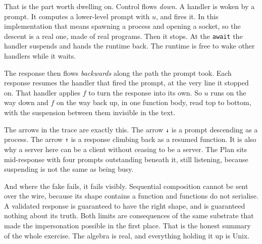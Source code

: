 \documentclass[11pt,a4paper]{article}
\begin{document}
That is the part worth dwelling on. Control flows \emph{down}. A handler is woken by a prompt. It
computes a lower-level prompt with $u$, and fires it. In this implementation that means spawning a
process and opening a socket, so the descent is a real one, made of real programs. Then it stops.
At the \texttt{await} the handler suspends and hands the runtime back. The runtime is free to wake
other handlers while it waits.

The response then flows \emph{backwards} along the path the prompt took. Each response resumes the
handler that fired the prompt, at the very line it stopped on. That handler applies $f$ to turn the
response into its own. So $u$ runs on the way down and $f$ on the way back up, in one function body,
read top to bottom, with the suspension between them invisible in the text.

The arrows in the trace are exactly this. The arrow \texttt{↓} is a prompt descending as a
process. The arrow \texttt{↑} is a response climbing back as a resumed function. It is also why a server here can be a
client without ceasing to be a server. The Plan sits mid-response with four prompts outstanding
beneath it, still listening, because suspending is not the same as being busy.

And where the fake fails, it fails visibly. Sequential composition cannot be sent over the wire,
because its shape contains a function and functions do not serialise. A validated response is
guaranteed to have the right shape, and is guaranteed nothing about its truth. Both limits are
consequences of the same substrate that made the impersonation possible in the first place. That is
the honest summary of the whole exercise. The algebra is real, and everything holding it up is
Unix.
\end{document}
